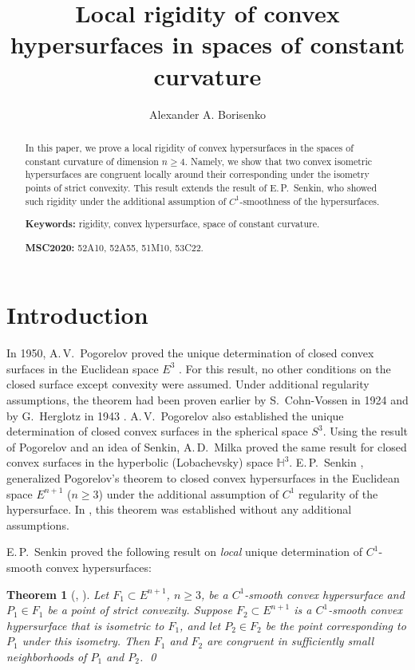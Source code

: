 \documentclass[11pt,oneside]{amsart}
\title[Local rigidity of convex hypersurfaces]{Local rigidity of convex hypersurfaces in spaces of constant curvature}
\author{Alexander A. Borisenko}
\date{}
\theoremstyle{theorem}
\newtheorem{theorem}{Theorem}
\theoremstyle{definition}
\theoremstyle{remark}
\begin{document}
\begin{abstract}
In this paper, we prove a local rigidity of convex hypersurfaces in the spaces of constant curvature of dimension $n\ge4$. Namely, we show that two convex isometric hypersurfaces are congruent locally around their corresponding under the isometry points of strict convexity. This result extends the result of E.\,P.~Senkin, who showed such rigidity under the additional assumption of $C^1$-smoothness of the hypersurfaces. 

\medskip	

\noindent
\textbf{Keywords:} rigidity, convex hypersurface, space of constant curvature.

\medskip
\noindent
\textbf{MSC2020: } 52A10, 52A55, 51M10, 53C22.
\end{abstract}

\maketitle

\section{Introduction}

In 1950, A.\,V.~Pogorelov proved the unique determination of closed convex surfaces in the Euclidean space $E^3$ \cite{Pog}. For this result, no other conditions on the closed surface except convexity were assumed. Under additional regularity assumptions, the theorem had been proven earlier by S.~Cohn-Vossen in 1924 \cite{CV} and by G.~Herglotz in 1943 \cite{Her}. A.\,V.~Pogorelov also established the unique determination of closed convex surfaces in the spherical space $S^3$. Using the result of Pogorelov and an idea of Senkin, A.\,D.~Milka \cite{Mil} proved the same result for closed convex surfaces in the hyperbolic (Lobachevsky) space $\mathbb H^3$. E.\,P.~Senkin \cite{Sen1}, \cite{Sen3} generalized Pogorelov's theorem to closed convex hypersurfaces in the Euclidean space $E^{n+1}$ ($n \ge 3$) under the additional assumption of $C^1$ regularity of the hypersurface. In \cite{Bor}, this theorem was established without any additional assumptions. 

E.\,P.~Senkin proved the following result on \emph{local} unique determination of $C^1$-smooth convex hypersurfaces:

\begin{theorem}[\cite{Sen1}, \cite{Sen3}]
\label{Thm:Sen2a}
Let $F_1 \subset E^{n+1}$, $n\ge 3$, be a $C^1$-smooth convex hypersurface and $P_1 \in F_1$ be a point of strict convexity. Suppose $F_2 \subset E^{n+1}$ is a $C^1$-smooth convex hypersurface that is isometric to $F_1$, and let $P_2 \in F_2$ be the point corresponding to $P_1$ under this isometry. Then $F_1$ and $F_2$ are congruent in sufficiently small neighborhoods of $P_1$ and $P_2$.   \qed
\end{theorem}
\end{document}
